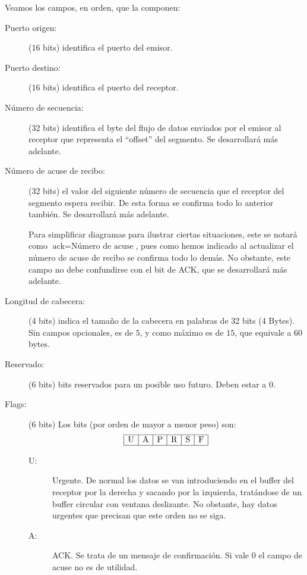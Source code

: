 Veamos los campos, en orden, que la componen:
\begin{description}
    \item [Puerto origen:] (16 bits) identifica el puerto del emisor.
    \item [Puerto destino:] (16 bits) identifica el puerto del receptor.
    \item [Número de secuencia:] (32 bits) identifica el byte del flujo de datos enviados por el emisor al receptor que representa el ``offset'' del segmento. Se desarrollará más adelante.
    \item [Número de acuse de recibo:] (32 bits) el valor del siguiente número de secuencia que el receptor del segmento espera recibir. De esta forma se confirma todo lo anterior también. Se desarrollará más adelante.
    \begin{observacion}
        Para simplificar diagramas para ilustrar ciertas situaciones, este se notará como $\text{ack}=\text{Número de acuse}$, pues como hemos indicado al actualizar el número de acuse de recibo se confirma todo lo demás. No obstante, este campo no debe confundirse con el bit de ACK, que se desarrollará más adelante.
    \end{observacion}
    \item [Longitud de cabecera:] (4 bits) indica el tamaño de la cabecera en palabras de 32 bits (4 Bytes). Sin campos opcionales, es de $5$, y como máximo es de $15$, que equivale a $60$ bytes.
    \item [Reservado: ] (6 bits) bits reservados para un posible uso futuro. Deben estar a $0$.
    \item [Flags: ] (6 bits) Los bits (por orden de mayor a menor peso) son:
        \begin{equation*}
            \begin{array}{|c|c|c|c|c|c|}
                \hline
                \text{U} & \text{A} & \text{P} & \text{R} & \text{S} & \text{F}\\
                \hline
            \end{array}
        \end{equation*}
        \begin{description}
            \item [U:] Urgente. De normal los datos se van introduciendo en el buffer del receptor por la derecha y sacando por la izquierda, tratándose de un buffer circular con ventana deslizante. No obstante, hay datos urgentes que precisan que este orden no se siga. 
            \item [A:] \acrshort{ACK}. Se trata de un mensaje de confirmación. Si vale 0 el campo de acuse no es de utilidad.

\end{description}
\end{description}
